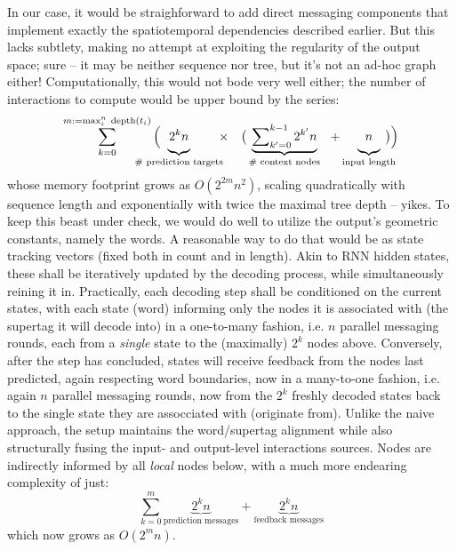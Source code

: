 In our case, it would be straighforward to add direct messaging components that implement exactly the spatiotemporal dependencies described earlier.
But this lacks subtlety, making no attempt at exploiting the regularity of the output space; sure -- it may be neither sequence nor tree, but it's not an ad-hoc graph either!
Computationally, this would not bode very well either; the number of interactions to compute would be upper bound by the series:
\begin{equation}\label{equation:dense_graph}
\sum_{k=0}^{m := \mathrm{max}_i^n ~ \mathrm{depth}(t_i)}
	\Big(
	\hspace{-22.5pt}
	\underbrace{\vphantom{\sum\nolimits_{k'}^{k}} 2^{k}n}_{\text{\# prediction targets}}
	\hspace{-5pt}
	\times
	~~~
	\big(
	\underbrace{\sum\nolimits_{k'=0}^{k-1} 2^{k'}n}_{\text{\# context nodes}}
	~~
	+ 
	\underbrace{\vphantom{\sum\nolimits_{k'}^{k}}  n}_{\text{input length}}
	\hspace{-10pt}
	\big)
	\Big)
\end{equation}
whose memory footprint grows as $O(2^{2m} n^2)$, scaling quadratically with sequence length and exponentially with twice the maximal tree depth -- yikes.
To keep this beast under check, we would do well to utilize the output's geometric constants, namely the words.
A reasonable way to do that would be as state tracking vectors (fixed both in count and in length).
Akin to RNN hidden states, these shall be iteratively updated by the decoding process, while simultaneously reining it in.
Practically, each decoding step shall be conditioned on the current states, with each state (word) informing only the nodes it is associated with (the supertag it will decode into) in a one-to-many fashion, i.e. $n$ parallel messaging rounds, each from a \textit{single} state to the (maximally) $2^k$ nodes above.
Conversely, after the step has concluded, states will receive feedback from the nodes last predicted, again respecting word boundaries, now in a many-to-one fashion, i.e. again $n$ parallel messaging rounds, now from the $2^k$ freshly decoded states back to the single state they are assocciated with (originate from).
Unlike the naive approach, the setup maintains the word/supertag alignment while also structurally fusing the input- and output-level interactions sources.
Nodes are indirectly informed by all \textit{local} nodes below, with a much more endearing complexity of just:
\begin{equation}
\sum_{k=0}^{m}
	\underbrace{2^{k} n}_{\text{prediction messages}}
	+
	\underbrace{2^{k} n}_{\text{feedback messages}}
\end{equation}
which now grows as $O(2^m n)$.

